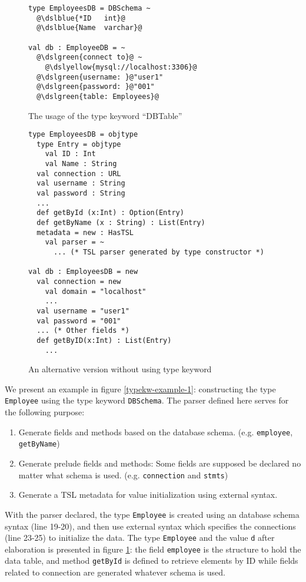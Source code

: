 \documentclass{sig-alternate}
\newcommand{\dslgreen}[1]{\textcolor[HTML]{339933}{#1}}
\newcommand{\dslblue}[1]{\textcolor[HTML]{336699}{#1}}
\newcommand{\dslyellow}[1]{\textcolor[HTML]{FFCC33}{#1}}
\begin{document}
\begin{figure}
\begin{lstlisting}[style=wyvern]
type EmployeesDB = DBSchema ~
  @\dslblue{*ID   int}@
  @\dslblue{Name  varchar}@

val db : EmployeeDB = ~
  @\dslgreen{connect to}@ ~
    @\dslyellow{mysql://localhost:3306}@
  @\dslgreen{username: }@"user1"
  @\dslgreen{password: }@"001"
  @\dslgreen{table: Employees}@
\end{lstlisting}
\vspace{-8px}
\caption{The usage of the type keyword ``DBTable''}
\vspace{-10px}
\end{figure}

\begin{figure}[ht]
\begin{lstlisting}[style=wyvern]
type EmployeesDB = objtype
  type Entry = objtype
    val ID : Int
    val Name : String 
  val connection : URL
  val username : String
  val password : String
  ...
  def getById (x:Int) : Option(Entry)
  def getByName (x : String) : List(Entry)
  metadata = new : HasTSL
    val parser = ~
      ... (* TSL parser generated by type constructor *)

val db : EmployeesDB = new
  val connection = new
    val domain = "localhost"
    ...
  val username = "user1"
  val password = "001"
  ... (* Other fields *)
  def getByID(x:Int) : List(Entry)
    ...
\end{lstlisting}
\vspace{-8px}
\caption{An alternative version without using type keyword}
\vspace{-10px}
\label{typekw-example-2}
\end{figure}
We present an example in figure \ref{typekw-example-1}: constructing the type \verb|Employee| using the type keyword \verb|DBSchema|. The parser defined here serves for the following purpose:
\begin{enumerate}\setlength{\itemsep}{0pt}
\item Generate fields and methods based on the database schema. (e.g. \verb|employee|, \verb|getByName|)
\item Generate prelude fields and methods: Some fields are supposed be declared no matter what schema is used. (e.g. \verb|connection| and \verb|stmts|)
\item Generate a TSL metadata for value initialization using external syntax. 
\end{enumerate}
With the parser declared, the type \verb|Employee| is created using an database schema syntax (line 19-20), and then use external syntax which specifies the connections (line 23-25) to initialize the data. The type \verb|Employee| and the value \verb|d| after elaboration is presented in figure \ref{typekw-example-2}: the field \verb|employee| is the structure to hold the data table, and method \verb|getById| is defined to retrieve elements by ID while fields related to connection are generated whatever schema is used.
\end{document}
